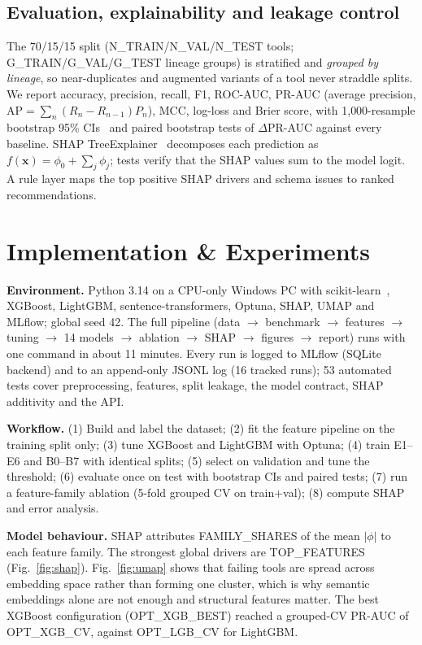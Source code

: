 \documentclass[conference]{IEEEtran}
\begin{document}
\subsection{Evaluation, explainability and leakage control}
The 70/15/15 split ({{N_TRAIN}}/{{N_VAL}}/{{N_TEST}} tools; {{G_TRAIN}}/{{G_VAL}}/{{G_TEST}} lineage groups) is stratified and \emph{grouped by lineage}, so near-duplicates and augmented variants of a tool never straddle splits. We report accuracy, precision, recall, F1, ROC-AUC, PR-AUC (average precision, $\mathrm{AP}=\sum_n (R_n-R_{n-1})P_n$), MCC, log-loss and Brier score, with 1{,}000-resample bootstrap 95\% CIs~\cite{efron} and paired bootstrap tests of $\Delta$PR-AUC against every baseline. SHAP TreeExplainer~\cite{shap} decomposes each prediction as $f(\mathbf{x})=\phi_0+\sum_j\phi_j$; tests verify that the SHAP values sum to the model logit. A rule layer maps the top positive SHAP drivers and schema issues to ranked recommendations.

\section{Implementation \& Experiments}
\textbf{Environment.} Python 3.14 on a CPU-only Windows PC with scikit-learn~\cite{sklearn}, XGBoost, LightGBM, sentence-transformers, Optuna, SHAP, UMAP and MLflow; global seed 42. The full pipeline (data $\rightarrow$ benchmark $\rightarrow$ features $\rightarrow$ tuning $\rightarrow$ 14 models $\rightarrow$ ablation $\rightarrow$ SHAP $\rightarrow$ figures $\rightarrow$ report) runs with one command in about 11 minutes. Every run is logged to MLflow (SQLite backend) and to an append-only JSONL log (16 tracked runs); 53 automated tests cover preprocessing, features, split leakage, the model contract, SHAP additivity and the API.

\textbf{Workflow.} (1) Build and label the dataset; (2) fit the feature pipeline on the training split only; (3) tune XGBoost and LightGBM with Optuna; (4) train E1--E6 and B0--B7 with identical splits; (5) select on validation and tune the threshold; (6) evaluate once on test with bootstrap CIs and paired tests; (7) run a feature-family ablation (5-fold grouped CV on train+val); (8) compute SHAP and error analysis.

\textbf{Model behaviour.} SHAP attributes {{FAMILY_SHARES}} of the mean $|\phi|$ to each feature family. The strongest global drivers are {{TOP_FEATURES}} (Fig.~\ref{fig:shap}). Fig.~\ref{fig:umap} shows that failing tools are spread across embedding space rather than forming one cluster, which is why semantic embeddings alone are not enough and structural features matter. The best XGBoost configuration ({{OPT_XGB_BEST}}) reached a grouped-CV PR-AUC of {{OPT_XGB_CV}}, against {{OPT_LGB_CV}} for LightGBM.
\end{document}
